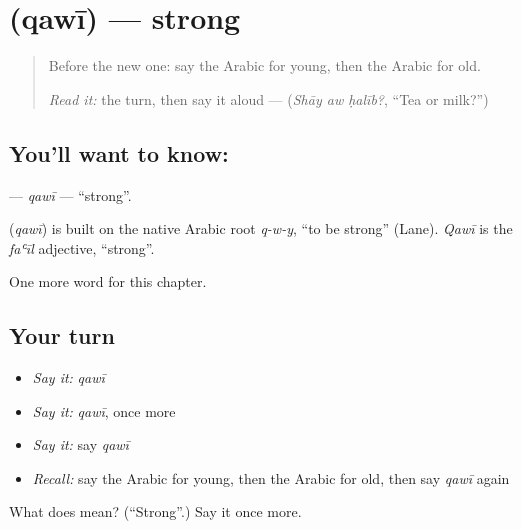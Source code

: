 \section[\texorpdfstring{\ar{قوي} (qawī)}{قوي (qawī)}]{ (qawī) — strong}

\label{lesson:AR-C154-qawi}



\begin{quote}
Before the new one: say the Arabic for young, then the Arabic for old.

\emph{Read it:} the turn, then say it aloud — \textbf{  } (\emph{Shāy aw ḥalīb?}, \textquotedblleft{}Tea or milk?\textquotedblright{})
\end{quote}

\subsection*{You'll want to know: }
\textbf{} — \emph{qawī} — \textquotedblleft{}strong\textquotedblright{}.

\begin{cousinweb}
\textbf{} (\emph{qawī}) is built on the native Arabic root \emph{q-w-y}, \textquotedblleft{}to be strong\textquotedblright{} (Lane). \emph{Qawī} is the \emph{faʿīl} adjective, \textquotedblleft{}strong\textquotedblright{}.
\end{cousinweb}

\begin{grammarlens}[title={What you've built}]
One more word for this chapter.
\end{grammarlens}

\subsection*{Your turn}
\begin{itemize}
\raggedright
  \item \emph{Say it:} \emph{qawī}
  \item \emph{Say it:} \emph{qawī}, once more
  \item \emph{Say it:} say \emph{qawī}
  \item \emph{Recall:} say the Arabic for young, then the Arabic for old, then say \emph{qawī} again
\end{itemize}

\begin{tcolorbox}[breakable,colback=teal!4,colframe=teal!35!black,title={Before you move on}]
What does  mean? (\textquotedblleft{}Strong\textquotedblright{}.) Say it once more.
\end{tcolorbox}
